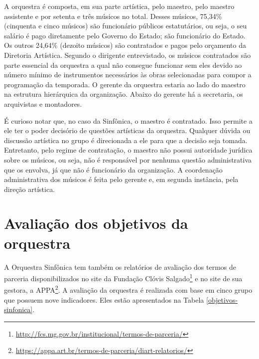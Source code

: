 \documentclass[a4paper, 12pt, openright, oneside, german, french, english, brazil]{abntex2}
\begin{document}
	A orquestra é composta, em sua parte artística, pelo maestro, pelo maestro assistente e por setenta e três músicos no total. Desses músicos, 75,34\% (cinquenta e cinco músicos) são funcionário públicos estatutários, ou seja, o seu salário é pago diretamente pelo Governo do Estado; são funcionário do Estado. Os outros 24,64\% (dezoito músicos) são contratados e pagos pelo orçamento da Diretoria Artística. Segundo o dirigente entrevistado, os músicos contratados são parte essencial da orquestra a qual não consegue funcionar sem eles devido ao número mínimo de instrumentos necessários às obras selecionadas para compor a programação da temporada. O gerente da orquestra estaria ao lado do maestro na estrutura hierárquica da organização. Abaixo do gerente há a secretaria, os arquivistas e montadores.
	
	É curioso notar que, no caso da Sinfônica, o maestro é contratado. Isso permite a ele ter o poder decisório de questões artísticas da orquestra. Qualquer dúvida ou discussão artística no grupo é direcionada a ele para que a decisão seja tomada. Entretanto, pelo regime de contratação, o maestro não possui autoridade jurídica sobre os músicos, ou seja, não é responsável por nenhuma questão administrativa que os envolva, já que não é funcionário da organização. A coordenação administrativa dos músicos é feita pelo gerente e, em segunda instância, pela direção artística.
	

	\section{Avaliação dos objetivos da orquestra}
	
	A Orquestra Sinfônica tem também os relatórios de avaliação dos termos de parceria disponibilizados no site da Fundação Clóvis Salgado\footnote{\url{http://fcs.mg.gov.br/institucional/termos-de-parceria/}} e no site de sua gestora, a APPA\footnote{\url{https://appa.art.br/termos-de-parceria/diart-relatorios/}}. A avaliação da orquestra é realizada com base em cinco grupo que possuem nove indicadores. Eles estão apresentados na Tabela \ref{objetivos-sinfonica}.
	
\end{document}
